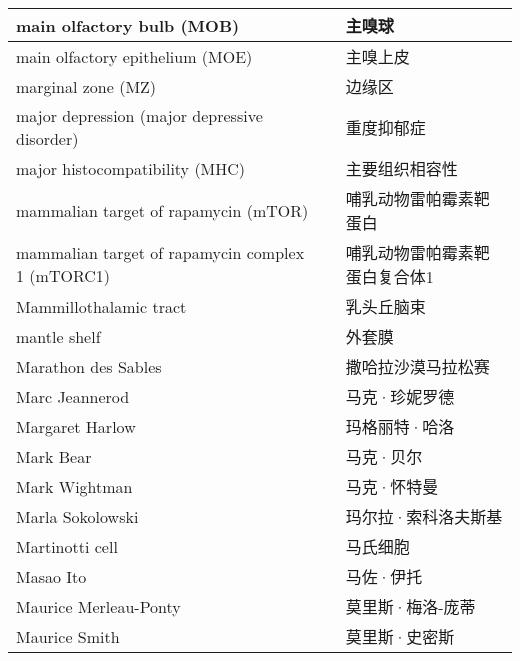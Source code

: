 \begin{longtable}{lll}
	\midrule
	main olfactory bulb (MOB) && 主嗅球  \\
	
	\midrule
	main olfactory epithelium (MOE)  && 主嗅上皮  \\
	
	\midrule
	marginal zone (MZ)   && 边缘区  \\
	
	\midrule
	major depression (major depressive disorder)   && 重度抑郁症  \\
	
	\midrule
	major histocompatibility (MHC)   && 主要组织相容性  \\
	
	\midrule
	mammalian target of rapamycin (mTOR)   && 哺乳动物雷帕霉素靶蛋白  \\
	
	\midrule
	mammalian target of rapamycin complex 1 (mTORC1)   && 哺乳动物雷帕霉素靶蛋白复合体1  \\
	
	\midrule
	Mammillothalamic tract   && 乳头丘脑束  \\
	
	\midrule
	mantle shelf   && 外套膜  \\
	
	\midrule
	Marathon des Sables   && 撒哈拉沙漠马拉松赛  \\
	
	\midrule
	Marc Jeannerod   && 马克·珍妮罗德  \\
	
	\midrule
	Margaret Harlow   && 玛格丽特·哈洛  \\
	
	\midrule
	Mark Bear   && 马克·贝尔  \\
	
	\midrule
	Mark Wightman   && 马克·怀特曼  \\
	
	\midrule
	Marla Sokolowski   && 玛尔拉·索科洛夫斯基 \\
	
	\midrule
	Martinotti cell   && 马氏细胞 \\
	
	\midrule
	Masao Ito   && 马佐·伊托 \\
	
	\midrule
	Maurice Merleau-Ponty   && 莫里斯·梅洛-庞蒂  \\
	
	\midrule
	Maurice Smith   && 莫里斯·史密斯  \\
	

\end{longtable}
